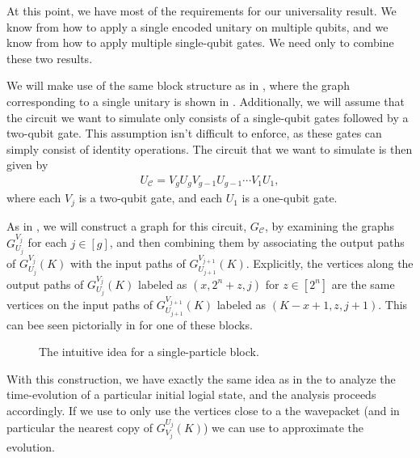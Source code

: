 \documentclass[../thesis-main/thesis-main]{subfiles}
\begin{document}
At this point, we have most of the requirements for our universality result.  We know from  how to apply a single encoded unitary on multiple qubits, and we know from  how to apply multiple single-qubit gates.  We need only to combine these two results.

We will make use of the same block structure as in , where the graph corresponding to a single unitary is shown in .  Additionally, we will assume that the circuit we want to simulate only consists of a single-qubit gates followed by a two-qubit gate.  This assumption isn't difficult to enforce, as these gates can simply consist of identity operations.  The circuit that we want to simulate is then given by
\begin{align}
  {U}_{\mathcal{C}} = V_{g} U_g V_{g-1} U_{g-1} \cdots V_{1} U_1,
\end{align}
where each $V_j$ is a two-qubit gate, and each $U_1$ is a one-qubit gate.

As in , we will construct a graph for this circuit, $G_{\mathcal{C}}$, by examining the graphs $G_{U_j}^{V_j}$ for each $j\in [g]$, and then combining them by associating the output paths of $G_{U_j}^{V_j}(K)$ with the input paths of $G_{U_{j+1}}^{V_{j+1}}(K)$.  Explicitly, the vertices along the output paths of $G_{U_j}^{V_j}(K)$ labeled as $(x,2^{n} + z, j)$ for $z\in [2^n]$ are the same vertices on the input paths of $G_{U_{j+1}}^{V_{j+1}}(K)$ labeled as $(K-x+1,z,j+1)$.  This can bee seen pictorially in  for one of these blocks.


\begin{figure}
  \centering
  
  \caption{The intuitive idea for a single-particle block.}
  \label{fig:SP_block}
\end{figure}
  
With this construction, we have exactly the same idea as in the  to analyze the time-evolution of a particular initial logial state, and the analysis proceeds accordingly.  If we use  to only use the vertices close to a the wavepacket (and in particular the nearest copy of $G_{V_j}^{U_j}(K)$) we can use  to approximate the evolution.
  
\end{document}
